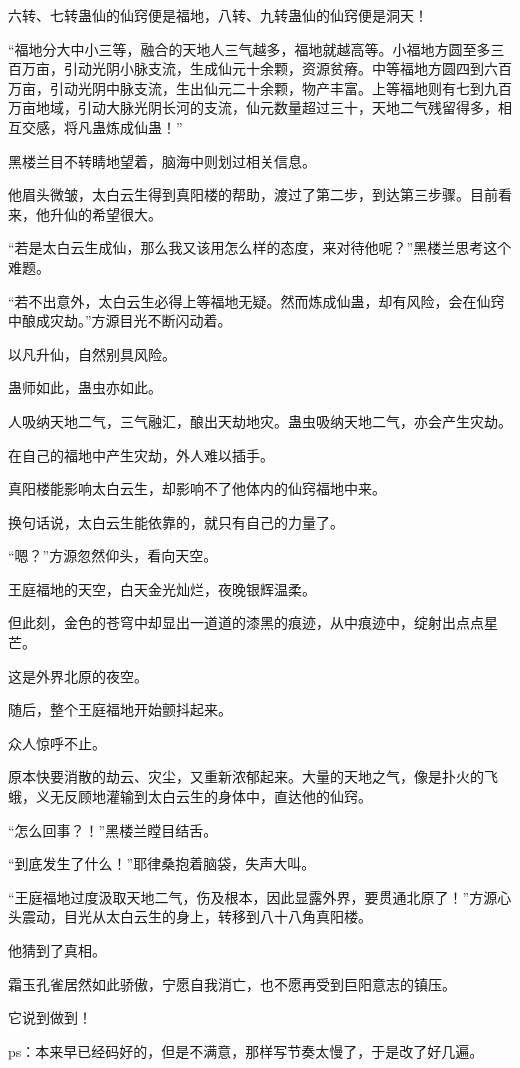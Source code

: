 \begin{this_body}
六转、七转蛊仙的仙窍便是福地，八转、九转蛊仙的仙窍便是洞天！

“福地分大中小三等，融合的天地人三气越多，福地就越高等。小福地方圆至多三百万亩，引动光阴小脉支流，生成仙元十余颗，资源贫瘠。中等福地方圆四到六百万亩，引动光阴中脉支流，生出仙元二十余颗，物产丰富。上等福地则有七到九百万亩地域，引动大脉光阴长河的支流，仙元数量超过三十，天地二气残留得多，相互交感，将凡蛊炼成仙蛊！”

黑楼兰目不转睛地望着，脑海中则划过相关信息。

他眉头微皱，太白云生得到真阳楼的帮助，渡过了第二步，到达第三步骤。目前看来，他升仙的希望很大。

“若是太白云生成仙，那么我又该用怎么样的态度，来对待他呢？”黑楼兰思考这个难题。

“若不出意外，太白云生必得上等福地无疑。然而炼成仙蛊，却有风险，会在仙窍中酿成灾劫。”方源目光不断闪动着。

以凡升仙，自然别具风险。

蛊师如此，蛊虫亦如此。

人吸纳天地二气，三气融汇，酿出天劫地灾。蛊虫吸纳天地二气，亦会产生灾劫。

在自己的福地中产生灾劫，外人难以插手。

真阳楼能影响太白云生，却影响不了他体内的仙窍福地中来。

换句话说，太白云生能依靠的，就只有自己的力量了。

“嗯？”方源忽然仰头，看向天空。

王庭福地的天空，白天金光灿烂，夜晚银辉温柔。

但此刻，金色的苍穹中却显出一道道的漆黑的痕迹，从中痕迹中，绽射出点点星芒。

这是外界北原的夜空。

随后，整个王庭福地开始颤抖起来。

众人惊呼不止。

原本快要消散的劫云、灾尘，又重新浓郁起来。大量的天地之气，像是扑火的飞蛾，义无反顾地灌输到太白云生的身体中，直达他的仙窍。

“怎么回事？！”黑楼兰瞠目结舌。

“到底发生了什么！”耶律桑抱着脑袋，失声大叫。

“王庭福地过度汲取天地二气，伤及根本，因此显露外界，要贯通北原了！”方源心头震动，目光从太白云生的身上，转移到八十八角真阳楼。

他猜到了真相。

霜玉孔雀居然如此骄傲，宁愿自我消亡，也不愿再受到巨阳意志的镇压。

它说到做到！

ps：本来早已经码好的，但是不满意，那样写节奏太慢了，于是改了好几遍。

\end{this_body}

